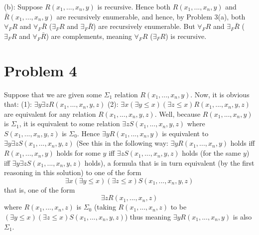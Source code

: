 \documentclass{article}
\theoremstyle{definition}
\begin{document}
(b): Suppose $R\left(x_1,...,x_n,y\right)$ is recursive. Hence both $R\left(x_1,...,x_n,y\right)$ and $\bar{R}\left(x_1,...,x_n,y\right)$ are 
recursively enumerable, and hence, by Problem 3(a), both $\forall_F R$ and $\forall_F\bar{R}$ ($\exists_F R$ and $\exists_F\bar{R}$) are recursively 
enumerable. But $\forall_F R$ and $\exists_F\bar{R}$ ($\exists_F R$ and $\forall_F\bar{R}$) are complements, meaning 
$\forall_F R$ ($\exists_F R$) is recursive.

\section*{Problem 4}
Suppose that we are given some $\Sigma_1$ relation $R\left(x_1,...,x_n,y\right)$. Now, it is obvious that:\newline
(1): $\exists y\exists zR\left(x_1,...,x_n,y,z\right)$\newline
(2): $\exists x\left(\exists y\le x\right)\left(\exists z\le x\right)R\left(x_1,...,x_n,y,z\right)$\newline
are equivalent for any relation $R\left(x_1,...,x_n,y,z\right)$. Well, because $R\left(x_1,...,x_n,y\right)$ is $\Sigma_1$, it is equivalent to 
some relation $\exists zS\left(x_1,...,x_n,y,z\right)$ where $S\left(x_1,...,x_n,y,z\right)$ is $\Sigma_0$. Hence 
$\exists yR\left(x_1,...,x_n,y\right)$ is equivalent to $\exists y\exists zS\left(x_1,...,x_n,y,z\right)$ (See this in the following way: 
$\exists yR\left(x_1,...,x_n,y\right)$ holds iff $R\left(x_1,...,x_n,y\right)$ holds for some $y$ iff $\exists zS\left(x_1,...,x_n,y,z\right)$ holds 
(for the same $y$) iff $\exists y\exists zS\left(x_1,...,x_n,y,z\right)$ holds), a formula that is in turn equivalent (by the first reasoning in this 
solution) to one of the form 
\[ \exists x\left(\exists y\le x\right)\left(\exists z\le x\right)S\left(x_1,...,x_n,y,z\right) \] that is, one of the form
\[ \exists zR\left(x_1,...,x_n,z\right) \] where $R\left(x_1,...,x_n,z\right)$ is $\Sigma_0$ (taking $R\left(x_1,...,x_n,z\right)$ to be 
$\left(\exists y\le x\right)\left(\exists z\le x\right)S\left(x_1,...,x_n,y,z\right)$) thus meaning 
$\exists yR\left(x_1,...,x_n,y\right)$ is also $\Sigma_1$.
\end{document}
